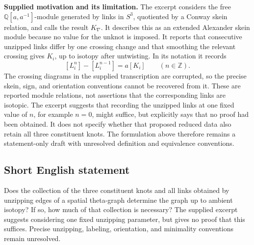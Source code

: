 \documentclass[11pt]{article}
\newcommand{\Z}{\mathbb{Z}}
\newcommand{\Q}{\mathbb{Q}}
\begin{document}
\textbf{Supplied motivation and its limitation.} The excerpt considers the free \(\Q[a,a^{-1}]\)-module generated by links in \(S^3\), quotiented by a Conway skein relation, and calls the result \(K_{\nabla}\). It describes this as an extended Alexander skein module because no value for the unknot is imposed. It reports that consecutive unzipped links differ by one crossing change and that smoothing the relevant crossing gives \(K_i\), up to isotopy after untwisting. In its notation it records
\[
[L_i^n]-[L_i^{n-1}]=a[K_i]\qquad(n\in\Z).
\]
The crossing diagrams in the supplied transcription are corrupted, so the precise skein, sign, and orientation conventions cannot be recovered from it. These are reported module relations, not assertions that the corresponding links are isotopic. The excerpt suggests that recording the unzipped links at one fixed value of \(n\), for example \(n=0\), might suffice, but explicitly says that no proof had been obtained. It does not specify whether that proposed reduced data also retain all three constituent knots. The formulation above therefore remains a statement-only draft with unresolved definition and equivalence conventions.
\subsection{Short English statement}
Does the collection of the three constituent knots and all links obtained by unzipping edges of a spatial theta-graph determine the graph up to ambient isotopy? If so, how much of that collection is necessary? The supplied excerpt suggests considering one fixed unzipping parameter, but gives no proof that this suffices. Precise unzipping, labeling, orientation, and minimality conventions remain unresolved.
\end{document}
